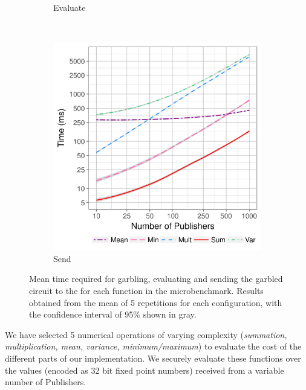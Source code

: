 \begin{figure}[ht]
\begin{subfigure}[b]{0.32\textwidth}
        \caption{Evaluate}
        \label{fig:micro-eval-time}
    \end{subfigure}
    ~ %
    \begin{subfigure}[b]{0.32\textwidth}
        \includegraphics[width=\textwidth]{plots/send_loglog.png}
        \caption{Send}
        \label{fig:micro-send-time}
    \end{subfigure}
    \caption{Mean time required for garbling, evaluating and sending the
      garbled circuit to the \broker for each function in the microbenchmark.
      Results obtained from the mean of 5 repetitions for each configuration,
      with the confidence interval of 95\% shown in gray.}
    \label{fig:micro-times}
\end{figure}

We have selected 5 numerical operations of varying complexity (\emph{summation,
multiplication, mean, variance, minimum/maximum}) to evaluate the cost of the
different parts of our implementation.  We securely evaluate these functions
over the values (encoded as 32 bit fixed point numbers) received from a
variable number of Publishers.

